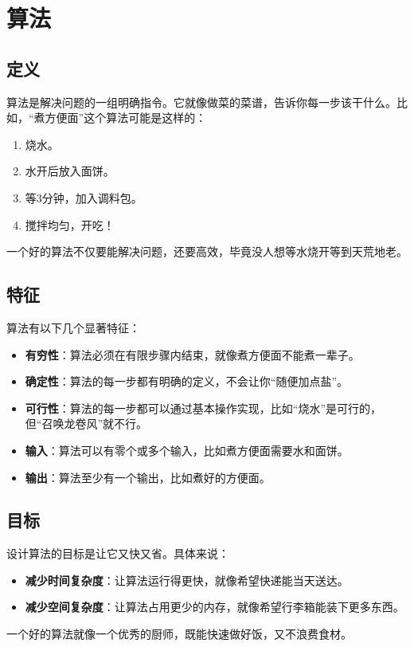 \documentclass[lang=cn,newtx,10pt,scheme=chinese]{elegantbook}
\begin{document}
\section{算法}

\subsection{定义}
算法是解决问题的一组明确指令。它就像做菜的菜谱，告诉你每一步该干什么。比如，“煮方便面”这个算法可能是这样的：
\begin{enumerate}
    \item 烧水。
    \item 水开后放入面饼。
    \item 等3分钟，加入调料包。
    \item 搅拌均匀，开吃！
\end{enumerate}
一个好的算法不仅要能解决问题，还要高效，毕竟没人想等水烧开等到天荒地老。

\subsection{特征}
算法有以下几个显著特征：
\begin{itemize}
    \item \textbf{有穷性}：算法必须在有限步骤内结束，就像煮方便面不能煮一辈子。
    \item \textbf{确定性}：算法的每一步都有明确的定义，不会让你“随便加点盐”。
    \item \textbf{可行性}：算法的每一步都可以通过基本操作实现，比如“烧水”是可行的，但“召唤龙卷风”就不行。
    \item \textbf{输入}：算法可以有零个或多个输入，比如煮方便面需要水和面饼。
    \item \textbf{输出}：算法至少有一个输出，比如煮好的方便面。
\end{itemize}

\subsection{目标}
设计算法的目标是让它又快又省。具体来说：
\begin{itemize}
    \item \textbf{减少时间复杂度}：让算法运行得更快，就像希望快递能当天送达。
    \item \textbf{减少空间复杂度}：让算法占用更少的内存，就像希望行李箱能装下更多东西。
\end{itemize}
一个好的算法就像一个优秀的厨师，既能快速做好饭，又不浪费食材。
\end{document}
